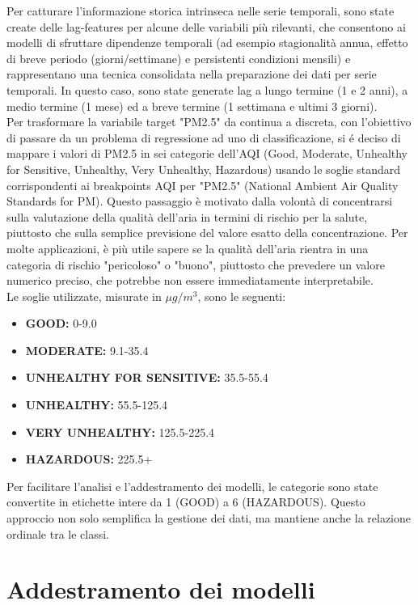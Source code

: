 \documentclass[a4paper,12pt]{report}
\begin{document}
	Per catturare l'informazione storica intrinseca nelle serie temporali, sono state create delle lag-features per alcune delle variabili più rilevanti, che consentono ai modelli di sfruttare dipendenze temporali (ad esempio stagionalità annua, effetto di breve periodo (giorni/settimane) e persistenti condizioni mensili) e rappresentano una tecnica consolidata nella preparazione dei dati per serie temporali. In questo caso, sono state generate lag a lungo termine (1 e 2 anni), a medio termine (1 mese) ed a breve termine (1 settimana e ultimi 3 giorni). \\
	Per trasformare la variabile target "PM2.5" da continua a discreta, con l'obiettivo di passare da un problema di regressione ad uno di classificazione, si é deciso di mappare i valori di PM2.5 in sei categorie dell'AQI (Good, Moderate, Unhealthy for Sensitive, Unhealthy, Very Unhealthy, Hazardous) usando le soglie standard corrispondenti ai breakpoints AQI per "PM2.5" (National Ambient Air Quality Standards for PM). Questo passaggio è motivato dalla volontà di concentrarsi sulla valutazione della qualità dell'aria in termini di rischio per la salute, piuttosto che sulla semplice previsione del valore esatto della concentrazione. Per molte applicazioni, è più utile sapere se la qualità dell'aria rientra in una categoria di rischio "pericoloso" o "buono", piuttosto che prevedere un valore numerico preciso, che potrebbe non essere immediatamente interpretabile.\\
	Le soglie utilizzate, misurate in $\mu g/m^3$, sono le seguenti:
	\begin{itemize}
		\item \textbf{GOOD:} 0-9.0
		\item \textbf{MODERATE:} 9.1-35.4
		\item \textbf{UNHEALTHY FOR SENSITIVE:} 35.5-55.4
		\item \textbf{UNHEALTHY:} 55.5-125.4
		\item \textbf{VERY UNHEALTHY:} 125.5-225.4
		\item \textbf{HAZARDOUS:} 225.5+
	\end{itemize}
	Per facilitare l'analisi e l'addestramento dei modelli, le categorie sono state convertite in etichette intere da 1 (GOOD) a 6 (HAZARDOUS). Questo approccio non solo semplifica la gestione dei dati, ma mantiene anche la relazione ordinale tra le classi.
	
	\section{Addestramento dei modelli}
	
\end{document}
